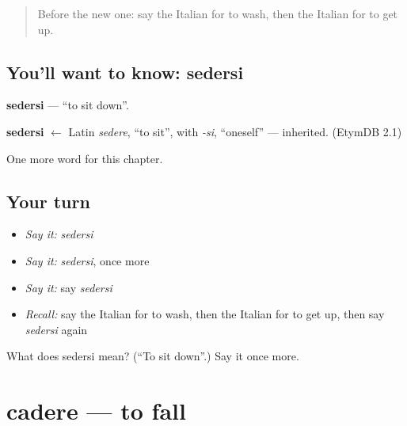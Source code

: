 \label{lesson:IT-C134-sedersi}



\begin{quote}
Before the new one: say the Italian for to wash, then the Italian for to get up.
\end{quote}

\subsection*{You'll want to know: sedersi}
\textbf{sedersi} — \textquotedblleft{}to sit down\textquotedblright{}.

\begin{cousinweb}
\textbf{sedersi} $\leftarrow$ Latin \emph{sedere}, \textquotedblleft{}to sit\textquotedblright{}, with \emph{-si}, \textquotedblleft{}oneself\textquotedblright{} — inherited. (EtymDB 2.1)
\end{cousinweb}

\begin{grammarlens}[title={What you've built}]
One more word for this chapter.
\end{grammarlens}

\subsection*{Your turn}
\begin{itemize}
\raggedright
  \item \emph{Say it:} \emph{sedersi}
  \item \emph{Say it:} \emph{sedersi}, once more
  \item \emph{Say it:} say \emph{sedersi}
  \item \emph{Recall:} say the Italian for to wash, then the Italian for to get up, then say \emph{sedersi} again
\end{itemize}

\begin{tcolorbox}[breakable,colback=teal!4,colframe=teal!35!black,title={Before you move on}]
What does sedersi mean? (\textquotedblleft{}To sit down\textquotedblright{}.) Say it once more.
\end{tcolorbox}
\section[cadere]{cadere — to fall}

\label{lesson:IT-C134-cadere}



